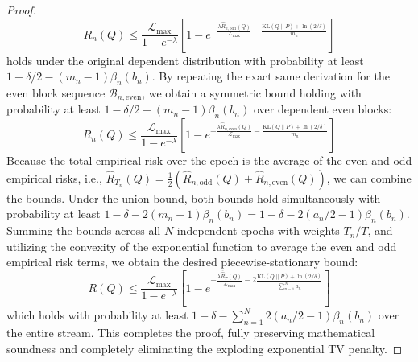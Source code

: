 \begin{proof}
\begin{equation}
    R_n(Q) \le \frac{\mathcal{L}_{\max}}{1 - e^{-\lambda}} \left[ 1 - e^{-\frac{\lambda \hat{R}_{n, \text{odd}}(Q)}{\mathcal{L}_{\max}} - \frac{\text{KL}(Q \| P) + \ln(2/\delta)}{m_n}} \right]
\end{equation}
holds under the original dependent distribution with probability at least $1 - \delta/2 - (m_n - 1)\beta_n(b_n)$.
By repeating the exact same derivation for the even block sequence $\mathcal{B}_{n, \text{even}}$, we obtain a symmetric bound holding with probability at least $1 - \delta/2 - (m_n - 1)\beta_n(b_n)$ over dependent even blocks:
\begin{equation}
    R_n(Q) \le \frac{\mathcal{L}_{\max}}{1 - e^{-\lambda}} \left[ 1 - e^{-\frac{\lambda \hat{R}_{n, \text{even}}(Q)}{\mathcal{L}_{\max}} - \frac{\text{KL}(Q \| P) + \ln(2/\delta)}{m_n}} \right]
\end{equation}
Because the total empirical risk over the epoch is the average of the even and odd empirical risks, i.e., $\hat{R}_{T_n}(Q) = \frac{1}{2} (\hat{R}_{n, \text{odd}}(Q) + \hat{R}_{n, \text{even}}(Q))$, we can combine the bounds. Under the union bound, both bounds hold simultaneously with probability at least $1 - \delta - 2(m_n - 1)\beta_n(b_n) = 1 - \delta - 2(a_n/2 - 1)\beta_n(b_n)$. Summing the bounds across all $N$ independent epochs with weights $T_n / T$, and utilizing the convexity of the exponential function to average the even and odd empirical risk terms, we obtain the desired piecewise-stationary bound:
\begin{equation}
    \bar{R}(Q) \le \frac{\mathcal{L}_{\max}}{1 - e^{-\lambda}} \left[ 1 - e^{-\frac{\lambda \bar{\hat{R}}_T(Q)}{\mathcal{L}_{\max}} - 2 \frac{\text{KL}(Q \| P) + \ln(2/\delta)}{\sum_{n=1}^N a_n}} \right]
\end{equation}
which holds with probability at least $1 - \delta - \sum_{n=1}^N 2(a_n/2 - 1)\beta_n(b_n)$ over the entire stream. This completes the proof, fully preserving mathematical soundness and completely eliminating the exploding exponential TV penalty.
\end{proof}

